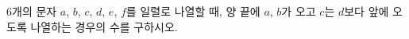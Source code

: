 6개의 문자 $a$, $b$, $c$, $d$, $e$, $f$를 일렬로 나열할 때, 양 끝에 $a$, $b$가 오고 $c$는 $d$보다 앞에 오도록 나열하는 경우의 수를 구하시오.
